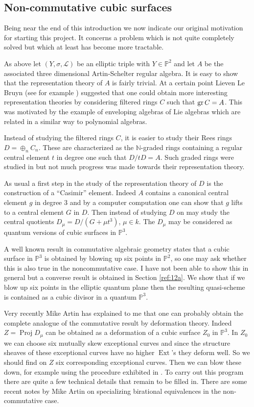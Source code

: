 \documentclass{amsproc}
\def \PP{{\mathbb P}}
\def \NN{{\mathbb N}}
\def\Lscr{{\mathcal L}}
\def\gr{\mathop{\text{gr}}}
\def\gr{\operatorname {gr}}
\def\Ext{\operatorname {Ext}}
\def\gr{\operatorname {gr}}
\def\Proj{\operatorname {Proj}}
\let\oldtext\text
\def\text#1{\oldtext{\upshape #1}}
\theoremstyle{definition}
\theoremstyle{remark}
\numberwithin{equation}{section}
\numberwithin{table}{section}
\numberwithin{figure}{section}
\def\gr{\mathop{\text{gr}}}
\begin{document}
\subsection{Non-commutative cubic surfaces}
Being near the end of this introduction we now indicate our original
motivation for starting this project. It concerns a problem
which is not quite completely solved but which at least has become
more tractable.

As above let $(Y,\sigma,\Lscr)$ be an elliptic triple with $Y\in
\PP^2$ and let $A$ be the associated three dimensional Artin-Schelter
regular algebra. It is easy to show that the representation theory of
$A$ is fairly trivial. At a certain point Lieven Le Bruyn (see for
example \cite{L})
suggested
that one could obtain more interesting representation theories by
considering filtered rings $C$ such that $\gr C=A$. This was motivated
by the example of enveloping algebras of Lie algebras which are
related in a similar way to polynomial algebras.

Instead of studying the filtered rings $C$, it is easier to study their
Rees rings $D=\oplus_n C_n$. These are characterized as the
$\NN$-graded rings containing a regular central element $t$ in degree
one such that $D/tD=A$. Such graded rings were studied in \cite{LSV}
but not much progress was made towards their representation theory. 

As usual a first step in the study of the representation theory of $D$
is the construction of a ``Casimir'' element. Indeed $A$ contains a
canonical central element $g$ in degree $3$ and by a computer
computation one can show that $g$ lifts to a central element $G$ in
$D$. Then instead of studying $D$ on may study the central quotients
$D_\mu=D/(G+\mu t^3)$, $\mu \in k$. The $D_\mu$ may be considered as
quantum versions of cubic surfaces in $\PP^3$.

A well known result in commutative algebraic geometry states that a
cubic surface in $\PP^3$ is obtained by blowing up six points in $\PP^2$, so one
may ask whether this is also true in the noncommutative case. I have
not been able to show this in general but a converse result is
obtained in Section \ref{ref:12a}. We show
that if we blow up six points in the elliptic quantum plane then the
resulting quasi-scheme is  contained as a cubic divisor in a
quantum $\PP^3$.

Very recently Mike Artin has explained to me that  one can probably
obtain the complete analogue of the commutative result by deformation
theory. Indeed $Z=\Proj D_\mu$ can be obtained as a deformation of a
cubic surface $Z_0$ in $\PP^3$. In  $Z_0$ we can choose six
mutually skew exceptional curves \cite{H}
 and since the structure sheaves  of these exceptional curves
have no higher $\Ext$'s they deform well. So we should find on $Z$ six
corresponding exceptional curves. Then we can blow these down, for
example using the procedure exhibited in \cite{VdB24}.
To carry out this program there are quite a few technical details that
remain to be filled in. There are some recent notes by Mike
Artin on specializing birational equivalences in the non-commutative
case. 
\end{document}
